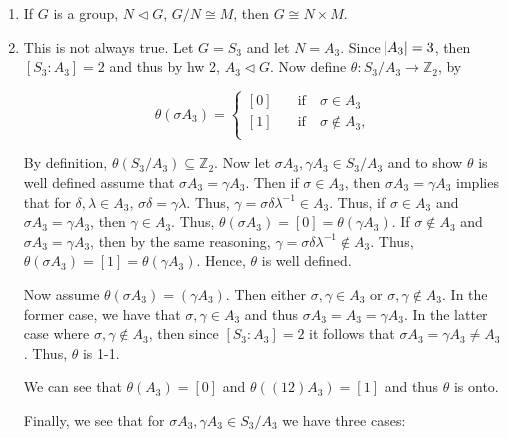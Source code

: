 \documentclass[12pt]{article}
\makeatletter
\theoremstyle{definition}
\theoremstyle{remark}
\renewenvironment{proof}[1][\proofname]{\par
  \pushQED{\qed}%
  \normalfont \topsep6\p@\@plus6\p@\relax
  \list{}{\leftmargin=0mm
          \rightmargin=4mm
          \settowidth{\itemindent}{\itshape#1}%
          \labelwidth=\itemindent
          \parsep=0pt \listparindent=\parindent 
  }
  \item[\hskip\labelsep
        \itshape
    #1\@addpunct{.}]\ignorespaces
}{%
  \popQED\endlist\@endpefalse
}
\let\oldproofname=\proofname
\renewcommand{\proofname}{\bf{\textit{\oldproofname}}}
\makeatother
\begin{document}
\begin{enumerate}[leftmargin=*]
\begin{enumerate}[label=(\alph*)]
                    \item If $G$ is a group, $N\triangleleft G$, $G/N\cong M$, then $G\cong N\times M$.
                        \begin{proof}
                            This is not always true. Let $G=S_3$ and let $N=A_3$. Since $\abs{A_3}=3$, then $[S_3\colon A_3]=2$ and thus by hw 2, $A_3\triangleleft G$. Now define $\theta\colon S_3/A_3\rightarrow\mathbb{Z}_2$, by 
                            
                           \begin{equation*}
                                \theta(\sigma A_3)=
                                \begin{cases} 
                                    [0] & \quad\text{if}\quad \sigma\in A_3 \\
                                    [1] & \quad\text{if}\quad \sigma\notin A_3, \\
                                \end{cases}
                            \end{equation*}
                            
                            By definition, $\theta(S_3/A_3)\subseteq\mathbb{Z}_2$. Now let $\sigma A_3,\gamma A_3\in S_3/A_3$ and to show $\theta$ is well defined assume that $\sigma A_3=\gamma A_3$. Then if $\sigma\in A_3$, then $\sigma A_3=\gamma A_3$ implies that for $\delta,\lambda\in A_3$, $\sigma\delta=\gamma\lambda$. Thus, $\gamma=\sigma\delta\lambda^{-1}\in A_3$. Thus, if $\sigma\in A_3$ and $\sigma A_3=\gamma A_3$, then $\gamma\in A_3$. Thus, $\theta(\sigma A_3)=[0]=\theta(\gamma A_3)$. If $\sigma\notin A_3$ and $\sigma A_3=\gamma A_3$, then by the same reasoning, $\gamma=\sigma\delta\lambda^{-1}\notin A_3$. Thus, $\theta(\sigma A_3)=[1]=\theta(\gamma A_3)$. Hence, $\theta$ is well defined.\par\hspace{4mm} Now assume $\theta(\sigma A_3)=(\gamma A_3)$. Then either $\sigma,\gamma\in A_3$ or $\sigma,\gamma\notin A_3$. In the former case, we have that $\sigma,\gamma\in A_3$ and thus $\sigma A_3=A_3=\gamma A_3$. In the latter case where $\sigma,\gamma\notin A_3$, then since $[S_3\colon A_3]=2$ it follows that $\sigma A_3=\gamma A_3\neq A_3$. Thus, $\theta$ is 1-1.\par\hspace{4mm} We can see that $\theta(A_3)=[0]$ and $\theta((12)A_3)=[1]$ and thus $\theta$ is onto.\par Finally, we see that for $\sigma A_3,\gamma A_3\in S_3/A_3$ we have three cases:
                            

\end{proof}
\end{enumerate}
\end{enumerate}
\end{document}

